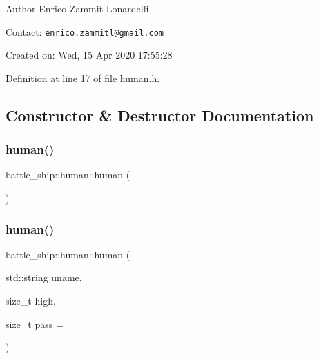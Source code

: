 \begin{DoxyAuthor}{Author}
Enrico Zammit Lonardelli
\end{DoxyAuthor}
Contact\+: \href{mailto:enrico.zammitl@gmail.com}{\tt enrico.\+zammitl@gmail.\+com}

Created on\+: Wed, 15 Apr 2020 17\+:55\+:28 

Definition at line 17 of file human.\+h.



\subsection{Constructor \& Destructor Documentation}
\mbox{\label{classbattle__ship_1_1human_abf9adbf70e2b5cec288c900f337f4c56}} 
\subsubsection{\texorpdfstring{human()}{human()}\hspace{0.1cm}{\footnotesize\ttfamily [1/2]}}
{\footnotesize\ttfamily battle\+\_\+ship\+::human\+::human (\begin{DoxyParamCaption}{ }\end{DoxyParamCaption})\hspace{0.3cm}{\ttfamily [default]}}

\mbox{\label{classbattle__ship_1_1human_a9d8abd36c22aeddad8c57a5b1e74b4cd}} 
\subsubsection{\texorpdfstring{human()}{human()}\hspace{0.1cm}{\footnotesize\ttfamily [2/2]}}
{\footnotesize\ttfamily battle\+\_\+ship\+::human\+::human (\begin{DoxyParamCaption}\item[{std\+::string}]{uname,  }\item[{size\+\_\+t}]{high,  }\item[{size\+\_\+t}]{pass = {} }\end{DoxyParamCaption})\hspace{0.3cm}{\ttfamily [inline]}}



